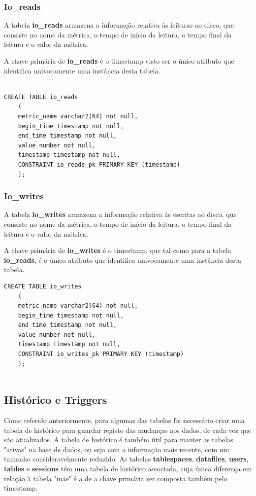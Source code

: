 \subsubsection*{Io\_reads}

A tabela \textbf{io\_reads} armazena a informação relativa às leituras ao disco, que consiste no nome da métrica, o tempo de início da leitura, o tempo final da leitura e o valor da métrica.

A chave primária de \textbf{io\_reads} é o timestamp visto ser o único atributo que identifica univocamente uma instância desta tabela.
\begin{verbatim}
    
CREATE TABLE io_reads
    (
    metric_name varchar2(64) not null,
    begin_time timestamp not null,
    end_time timestamp not null,
    value number not null,
    timestamp timestamp not null,
    CONSTRAINT io_reads_pk PRIMARY KEY (timestamp)
    );
\end{verbatim}
\subsubsection*{Io\_writes}
A tabela \textbf{io\_writes} armazena a informação relativa às escritas ao disco, que consiste no nome da métrica, o tempo de início da leitura, o tempo final da leitura e o valor da métrica.

A chave primária de \textbf{io\_writes} é o timestamp, que tal como para a tabela \textbf{io\_reads}, é o único atributo que identifica univocamente uma instância desta tabela.
\begin{verbatim}
CREATE TABLE io_writes
    (
    metric_name varchar2(64) not null,
    begin_time timestamp not null,
    end_time timestamp not null,
    value number not null,
    timestamp timestamp not null,
    CONSTRAINT io_writes_pk PRIMARY KEY (timestamp)
    );
    
\end{verbatim}
\subsection*{Histórico e Triggers}
Como referido anteriormente, para algumas das tabelas foi necessário criar uma tabela de histórico para guardar registo das mudanças aos dados, de cada vez que são atualizados. A tabela de histórico é também útil para manter as tabelas "ativas" na base de dados, ou seja com a informação mais recente, com um tamanho consideravelmente reduzido. As tabelas \textbf{tablespaces}, \textbf{datafiles}, \textbf{users}, \textbf{tables} e \textbf{sessions} têm uma tabela de histórico associada, cuja única diferença em relação à tabela "mãe" é a de a chave primária ser composta também pelo timestamp.

